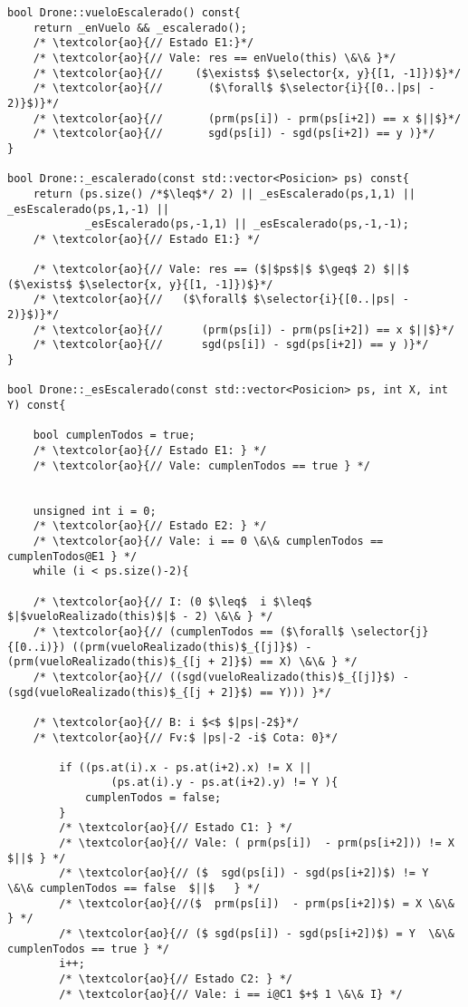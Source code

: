 \begin{lstlisting}
bool Drone::vueloEscalerado() const{
    return _enVuelo && _escalerado();
    /* \textcolor{ao}{// Estado E1:}*/
    /* \textcolor{ao}{// Vale: res == enVuelo(this) \&\& }*/
    /* \textcolor{ao}{//     ($\exists$ $\selector{x, y}{[1, -1]})$}*/
    /* \textcolor{ao}{//       ($\forall$ $\selector{i}{[0..|ps| - 2)}$)}*/
    /* \textcolor{ao}{//       (prm(ps[i]) - prm(ps[i+2]) == x $||$}*/
    /* \textcolor{ao}{//       sgd(ps[i]) - sgd(ps[i+2]) == y )}*/
}

bool Drone::_escalerado(const std::vector<Posicion> ps) const{
    return (ps.size() /*$\leq$*/ 2) || _esEscalerado(ps,1,1) || _esEscalerado(ps,1,-1) ||
            _esEscalerado(ps,-1,1) || _esEscalerado(ps,-1,-1);
    /* \textcolor{ao}{// Estado E1:} */

    /* \textcolor{ao}{// Vale: res == ($|$ps$|$ $\geq$ 2) $||$ ($\exists$ $\selector{x, y}{[1, -1]})$}*/
    /* \textcolor{ao}{//   ($\forall$ $\selector{i}{[0..|ps| - 2)}$)}*/
    /* \textcolor{ao}{//      (prm(ps[i]) - prm(ps[i+2]) == x $||$}*/
    /* \textcolor{ao}{//      sgd(ps[i]) - sgd(ps[i+2]) == y )}*/
}

bool Drone::_esEscalerado(const std::vector<Posicion> ps, int X, int Y) const{

    bool cumplenTodos = true;
    /* \textcolor{ao}{// Estado E1: } */
    /* \textcolor{ao}{// Vale: cumplenTodos == true } */


    unsigned int i = 0;
    /* \textcolor{ao}{// Estado E2: } */
    /* \textcolor{ao}{// Vale: i == 0 \&\& cumplenTodos == cumplenTodos@E1 } */
    while (i < ps.size()-2){
    
    /* \textcolor{ao}{// I: (0 $\leq$  i $\leq$ $|$vueloRealizado(this)$|$ - 2) \&\& } */
    /* \textcolor{ao}{// (cumplenTodos == ($\forall$ \selector{j}{[0..i)}) ((prm(vueloRealizado(this)$_{[j]}$) - (prm(vueloRealizado(this)$_{[j + 2]}$) == X) \&\& } */ 
    /* \textcolor{ao}{// ((sgd(vueloRealizado(this)$_{[j]}$) - (sgd(vueloRealizado(this)$_{[j + 2]}$) == Y))) }*/
     
    /* \textcolor{ao}{// B: i $<$ $|ps|-2$}*/
    /* \textcolor{ao}{// Fv:$ |ps|-2 -i$ Cota: 0}*/

        if ((ps.at(i).x - ps.at(i+2).x) != X ||
                (ps.at(i).y - ps.at(i+2).y) != Y ){
            cumplenTodos = false;
        }
        /* \textcolor{ao}{// Estado C1: } */
        /* \textcolor{ao}{// Vale: ( prm(ps[i])  - prm(ps[i+2])) != X $||$ } */ 
        /* \textcolor{ao}{// ($  sgd(ps[i]) - sgd(ps[i+2])$) != Y  \&\& cumplenTodos == false  $||$   } */ 
        /* \textcolor{ao}{//($  prm(ps[i])  - prm(ps[i+2])$) = X \&\& } */ 
        /* \textcolor{ao}{// ($ sgd(ps[i]) - sgd(ps[i+2])$) = Y  \&\& cumplenTodos == true } */
        i++;
        /* \textcolor{ao}{// Estado C2: } */
        /* \textcolor{ao}{// Vale: i == i@C1 $+$ 1 \&\& I} */


\end{lstlisting}
